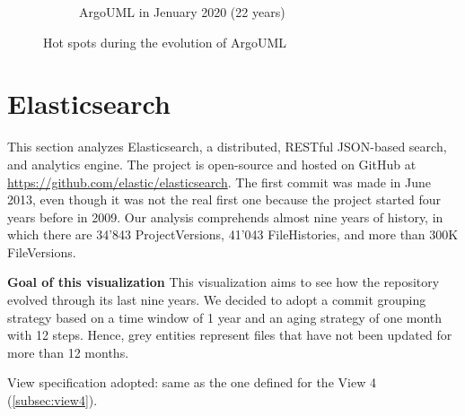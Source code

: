 \begin{figure}[ht]
\begin{subfigure}{0.48\textwidth}
        \caption{ArgoUML in Jenuary 2020 (22 years)} 
        \label{fig:ArgoUML_V3_S6}
    \end{subfigure}
    
    \caption{Hot spots during the evolution of ArgoUML} 
    \label{fig:ArgoUML_V3}
\end{figure}
\clearpage

\section{Elasticsearch}
This section analyzes Elasticsearch, a distributed, RESTful JSON-based search, and analytics engine. 
The project is open-source and hosted on GitHub at \url{https://github.com/elastic/elasticsearch}. 
The first commit was made in June 2013, even though it was not the real first one because the project started four years before in 2009. 
Our analysis comprehends almost nine years of history, in which there are 34'843 ProjectVersions, 41'043 FileHistories, and more than 300K FileVersions. 

\textbf{Goal of this visualization}
This visualization aims to see how the repository evolved through its last nine years. We decided to adopt a commit grouping strategy based on a time window of 1 year and an aging strategy of one month with 12 steps. Hence, grey entities represent files that have not been updated for more than 12 months. 


View specification adopted: same as the one defined for the View 4 (\autoref{subsec:view4}).

